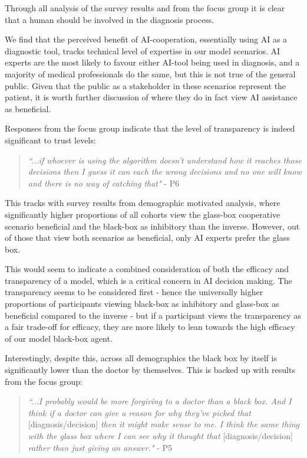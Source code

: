 \documentclass[manuscript,screen,review]{acmart}
\begin{document}
Through all analysis of the survey results and from the focus group it is clear that a human should be involved in the diagnosis process.

We find that the perceived benefit of AI-cooperation, essentially using AI as a diagnostic tool, tracks technical level of expertise in our model scenarios. AI experts are the most likely to favour either AI-tool being used in diagnosis, and a majority of medical professionals do the same, but this is not true of the general public. Given that the public as a stakeholder in these scenarios represent the patient, it is worth further discussion of where they do in fact view AI assistance as beneficial.

Responses from the focus group indicate that the level of transparency is indeed significant to trust levels:

\begin{quote}
    \textit{``...if whoever is using the algorithm doesn't understand how it reaches those decisions then I guess it can each the wrong decisions and no one will know and there is no way of catching that"} - P6
\end{quote}

This tracks with survey results from demographic motivated analysis, where significantly higher proportions of all cohorts view the glass-box cooperative scenario beneficial and the black-box as inhibitory than the inverse. However, out of those that view both scenarios as beneficial, only AI experts prefer the glass box.

This would seem to indicate a combined consideration of both the efficacy and transparency of a model, which is a critical concern in AI decision making. The transparency seems to be considered first - hence the universally higher proportions of participants viewing black-box as inhibitory and glass-box as beneficial compared to the inverse - but if a participant views the transparency as a fair trade-off for efficacy, they are more likely to lean towards the high efficacy of our model black-box agent.

Interestingly, despite this, across all demographics the black box by itself is significantly lower than the doctor by themselves. This is backed up with results from the focus group:

\begin{quote}
    \textit{``...I probably would be more forgiving to a doctor than a black box. And I think if a doctor can give a reason for why they’ve picked that} [diagnosis/decision] \textit{then it might make sense to me. I think the same thing with the glass box where I can see why it thought that} [diagnosis/decision] \textit{rather than just giving an answer."} - P5
\end{quote}
\end{document}
